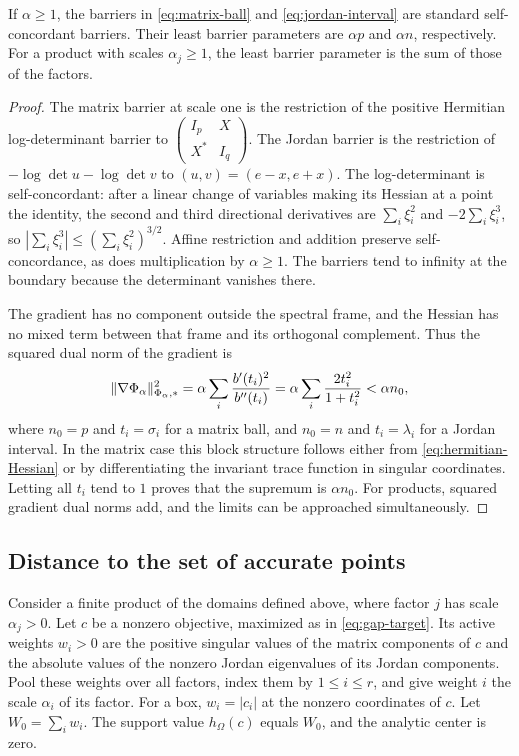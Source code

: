 \begin{proposition}
\label{prop:standard-parameters}
If $\alpha\geq1$, the barriers in \eqref{eq:matrix-ball} and
\eqref{eq:jordan-interval} are standard self-concordant barriers.
Their least barrier parameters are $\alpha p$ and $\alpha n$,
respectively. For a product with scales $\alpha_j\geq1$, the least
barrier parameter is the sum of those of the factors.
\end{proposition}
\begin{proof}
The matrix barrier at scale one is the restriction of the positive
Hermitian log-determinant barrier to
$\left(\begin{smallmatrix}I_p&X\\X^*&I_q\end{smallmatrix}\right)$.
The Jordan barrier is the restriction of
$-\log\det u-\log\det v$ to $(u,v)=(e-x,e+x)$.
The log-determinant is self-concordant: after a linear change of
variables making its Hessian at a point the identity, the second and
third directional derivatives are
$\sum_i\xi_i^2$ and $-2\sum_i\xi_i^3$, so
$|\sum_i\xi_i^3|\leq(\sum_i\xi_i^2)^{3/2}$.
Affine restriction and addition preserve self-concordance, as does
multiplication by $\alpha\geq1$. The barriers tend to infinity at the
boundary because the determinant vanishes there.

The gradient has no component outside the spectral frame, and the
Hessian has no mixed term between that frame and its orthogonal
complement. Thus the squared dual norm of the gradient is
\begin{equation}
 \lVert \nabla\Phi_\alpha\rVert_{\Phi_\alpha,*}^2
 =\alpha\sum_i\frac{b'(t_i)^2}{b''(t_i)}
 =\alpha\sum_i\frac{2t_i^2}{1+t_i^2}
 <\alpha n_0,
 \label{eq:exact-standard-parameter}
\end{equation}
where $n_0=p$ and $t_i=\sigma_i$ for a matrix ball, and $n_0=n$ and
$t_i=\lambda_i$ for a Jordan interval. In the matrix case this block
structure follows either from \eqref{eq:hermitian-Hessian} or by
differentiating the invariant trace function in singular coordinates.
Letting all $t_i$ tend to $1$ proves that the supremum is $\alpha n_0$.
For products, squared gradient dual norms add, and the limits can be
approached simultaneously.
\end{proof}

\subsection{Distance to the set of accurate points}
\label{subsec:water-filling}
Consider a finite product of the domains defined above, where factor
$j$ has scale $\alpha_j>0$. Let $c$ be a nonzero objective, maximized as
in \eqref{eq:gap-target}. Its active weights $w_i>0$ are the positive
singular values of the matrix components of $c$ and the absolute values
of the nonzero Jordan eigenvalues of its Jordan components. Pool these
weights over all factors, index them by $1\leq i\leq r$, and give weight
$i$ the scale $\alpha_i$ of its factor. For a box, $w_i=|c_i|$ at the
nonzero coordinates of $c$. Let $W_0=\sum_i w_i$. The support value
$h_\Omega(c)$ equals $W_0$, and the analytic center is zero.

